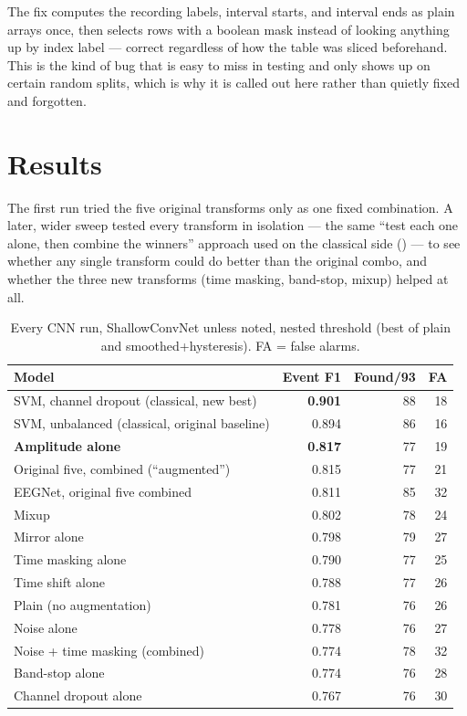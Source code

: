 The fix computes the recording labels, interval starts, and interval ends as plain arrays once,
then selects rows with a boolean mask instead of looking anything up by index label --- correct
regardless of how the table was sliced beforehand. This is the kind of bug that is easy to miss
in testing and only shows up on certain random splits, which is why it is called out here rather
than quietly fixed and forgotten.

\section{Results}

The first run tried the five original transforms only as one fixed combination. A later, wider
sweep tested every transform in isolation --- the same ``test each one alone, then combine the
winners'' approach used on the classical side () --- to see whether any
single transform could do better than the original combo, and whether the three new transforms
(time masking, band-stop, mixup) helped at all.

\begin{table}[H]
  \centering
  \small
  \caption{Every CNN run, ShallowConvNet unless noted, nested threshold (best of plain and
    smoothed+hysteresis). FA = false alarms.}
  \label{tab:cnn-results}
  \begin{tabular}{lrrr}
    \toprule
    Model & Event F1 & Found/93 & FA \\
    \midrule
    SVM, channel dropout (classical, new best) & \textbf{0.901} & 88 & 18 \\
    SVM, unbalanced (classical, original baseline) & 0.894 & 86 & 16 \\
    \midrule
    \textbf{Amplitude alone} & \textbf{0.817} & 77 & 19 \\
    Original five, combined (``augmented'') & 0.815 & 77 & 21 \\
    EEGNet, original five combined & 0.811 & 85 & 32 \\
    Mixup & 0.802 & 78 & 24 \\
    Mirror alone & 0.798 & 79 & 27 \\
    Time masking alone & 0.790 & 77 & 25 \\
    Time shift alone & 0.788 & 77 & 26 \\
    Plain (no augmentation) & 0.781 & 76 & 26 \\
    Noise alone & 0.778 & 76 & 27 \\
    Noise + time masking (combined) & 0.774 & 78 & 32 \\
    Band-stop alone & 0.774 & 76 & 28 \\
    Channel dropout alone & 0.767 & 76 & 30 \\
    \bottomrule
  \end{tabular}
\end{table}

